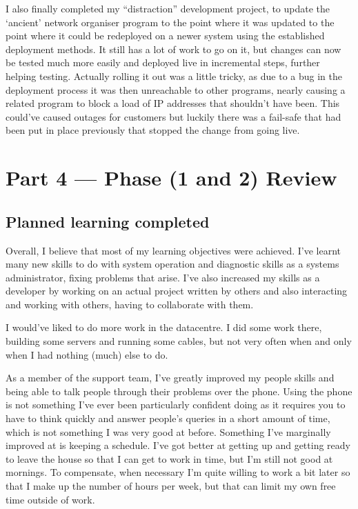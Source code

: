 \documentclass[12pt,a4paper]{article}
\begin{document}
	I also finally completed my ``distraction'' development project, to update
	the `ancient' network organiser program to the point where it was updated to
	the point where it could be redeployed on a newer system using the
	established deployment methods. It still has a lot of work to go on it, but
	changes can now be tested much more easily and deployed live in incremental
	steps, further helping testing. Actually rolling it out was a little tricky,
	as due to a bug in the deployment process it was then unreachable to other
	programs, nearly causing a related program to block a load of IP addresses
	that shouldn't have been. This could've caused outages for customers but
	luckily there was a fail-safe that had been put in place previously that
	stopped the change from going live.

\section*{Part 4 --- Phase (1 and 2) Review}
\subsection*{Planned learning completed}
	Overall, I believe that most of my learning objectives were achieved. I've
	learnt many new skills to do with system operation and diagnostic skills as
	a systems administrator, fixing problems that arise. I've also increased my
	skills as a developer by working on an actual project written by others and
	also interacting and working with others, having to collaborate with them.

	I would've liked to do more work in the datacentre. I did some work there,
	building some servers and running some cables, but not very often when and
	only when I had nothing (much) else to do.

	As a member of the support team, I've greatly improved my people skills and
	being able to talk people through their problems over the phone. Using the
	phone is not something I've ever been particularly confident doing as it
	requires you to have to think quickly and answer people's queries in a short
	amount of time, which is not something I was very good at before. Something
	I've marginally improved at is keeping a schedule. I've got better at
	getting up and getting ready to leave the house so that I can get to work in
	time, but I'm still not good at mornings. To compensate, when necessary I'm
	quite willing to work a bit later so that I make up the number of hours per
	week, but that can limit my own free time outside of work.
\end{document}
